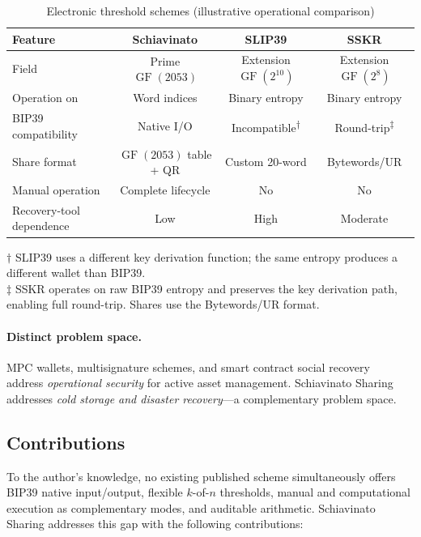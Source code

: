\documentclass[11pt]{article}
\newcommand{\GF}{\operatorname{GF}}
\begin{document}
\begin{table}[H]
\centering
\caption{Electronic threshold schemes (illustrative operational comparison)}
\label{tab:electronic}
\small
\begin{tabular}{@{}lccc@{}}
\toprule
\textbf{Feature} & \textbf{Schiavinato} & \textbf{SLIP39} & \textbf{SSKR} \\ \midrule
Field & Prime $\GF(2053)$ & Extension $\GF(2^{10})$ & Extension $\GF(2^8)$ \\
Operation on & Word indices & Binary entropy & Binary entropy \\
BIP39 compatibility & Native I/O & Incompatible\textsuperscript{$\dagger$} & Round-trip\textsuperscript{$\ddagger$} \\
Share format & $\GF(2053)$ table + QR & Custom 20-word & Bytewords/UR \\
Manual operation & Complete lifecycle & No & No \\
Recovery-tool dependence & Low & High & Moderate \\
\bottomrule
\end{tabular}

\medskip
\footnotesize
$\dagger$ SLIP39 uses a different key derivation function; the same entropy produces a different wallet than BIP39.\\
$\ddagger$ SSKR operates on raw BIP39 entropy and preserves the key derivation path, enabling full round-trip. Shares use the Bytewords/UR format.
\end{table}

\paragraph{Distinct problem space.} MPC wallets, multisignature schemes, and smart contract social recovery~\cite{buterin} address \emph{operational security} for active asset management. Schiavinato Sharing addresses \emph{cold storage and disaster recovery}---a complementary problem space.

\subsection{Contributions}

To the author's knowledge, no existing published scheme simultaneously offers BIP39 native input/output, flexible $k$-of-$n$ thresholds, manual and computational execution as complementary modes, and auditable arithmetic. Schiavinato Sharing addresses this gap with the following contributions:
\end{document}
